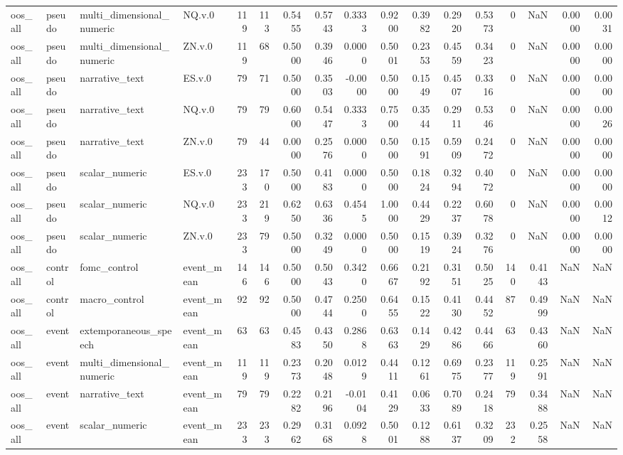\begin{tabular}{llllrrrrrrrrrrrrr}
oos_all & pseudo & multi_dimensional_numeric & NQ.v.0 & 119 & 113 & 0.5455 & 0.5743 & 0.3333 & 0.9200 & 0.3982 & 0.2920 & 0.5373 & 0 & NaN & 0.0000 & 0.0031 \\
oos_all & pseudo & multi_dimensional_numeric & ZN.v.0 & 119 & 68 & 0.5000 & 0.3946 & 0.0000 & 0.5001 & 0.2353 & 0.4559 & 0.3423 & 0 & NaN & 0.0000 & 0.0000 \\
oos_all & pseudo & narrative_text & ES.v.0 & 79 & 71 & 0.5000 & 0.3503 & -0.0000 & 0.5000 & 0.1549 & 0.4507 & 0.3316 & 0 & NaN & 0.0000 & 0.0000 \\
oos_all & pseudo & narrative_text & NQ.v.0 & 79 & 79 & 0.6000 & 0.5447 & 0.3333 & 0.7500 & 0.3544 & 0.2911 & 0.5346 & 0 & NaN & 0.0000 & 0.0026 \\
oos_all & pseudo & narrative_text & ZN.v.0 & 79 & 44 & 0.0000 & 0.2576 & 0.0000 & 0.5000 & 0.1591 & 0.5909 & 0.2472 & 0 & NaN & 0.0000 & 0.0000 \\
oos_all & pseudo & scalar_numeric & ES.v.0 & 233 & 170 & 0.5000 & 0.4183 & 0.0000 & 0.5000 & 0.1824 & 0.3294 & 0.4072 & 0 & NaN & 0.0000 & 0.0000 \\
oos_all & pseudo & scalar_numeric & NQ.v.0 & 233 & 219 & 0.6250 & 0.6336 & 0.4545 & 1.0000 & 0.4429 & 0.2237 & 0.6078 & 0 & NaN & 0.0000 & 0.0012 \\
oos_all & pseudo & scalar_numeric & ZN.v.0 & 233 & 79 & 0.5000 & 0.3249 & 0.0000 & 0.5000 & 0.1519 & 0.3924 & 0.3276 & 0 & NaN & 0.0000 & 0.0000 \\
oos_all & control & fomc_control & event_mean & 146 & 146 & 0.5000 & 0.5043 & 0.3420 & 0.6667 & 0.2192 & 0.3151 & 0.5025 & 140 & 0.4143 & NaN & NaN \\
oos_all & control & macro_control & event_mean & 92 & 92 & 0.5000 & 0.4744 & 0.2500 & 0.6455 & 0.1522 & 0.4130 & 0.4452 & 87 & 0.4999 & NaN & NaN \\
oos_all & event & extemporaneous_speech & event_mean & 63 & 63 & 0.4583 & 0.4350 & 0.2868 & 0.6363 & 0.1429 & 0.4286 & 0.4466 & 63 & 0.4360 & NaN & NaN \\
oos_all & event & multi_dimensional_numeric & event_mean & 119 & 119 & 0.2373 & 0.2048 & 0.0129 & 0.4411 & 0.1261 & 0.6975 & 0.2377 & 119 & 0.2591 & NaN & NaN \\
oos_all & event & narrative_text & event_mean & 79 & 79 & 0.2282 & 0.2196 & -0.0104 & 0.4129 & 0.0633 & 0.7089 & 0.2418 & 79 & 0.3488 & NaN & NaN \\
oos_all & event & scalar_numeric & event_mean & 233 & 233 & 0.2962 & 0.3168 & 0.0928 & 0.5001 & 0.1288 & 0.6137 & 0.3209 & 232 & 0.2558 & NaN & NaN \\

\end{tabular}
